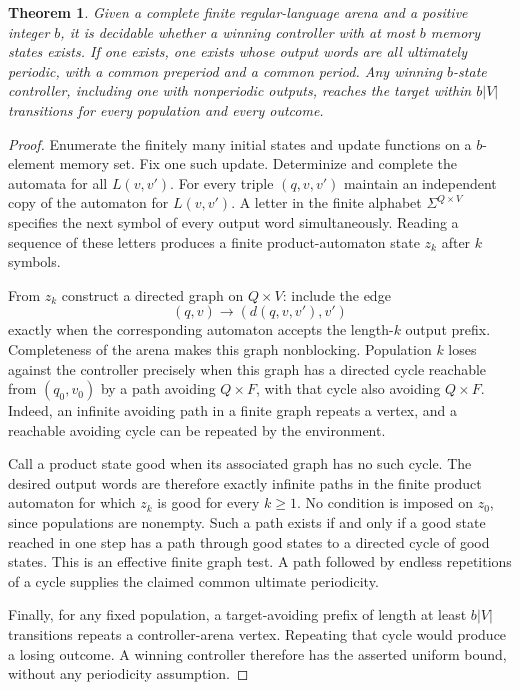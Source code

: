 \documentclass[11pt]{article}
\newtheorem{theorem}{Theorem}
\theoremstyle{definition}
\theoremstyle{remark}
\begin{document}
\begin{theorem}
Given a complete finite regular-language arena and a positive integer $b$, it is decidable whether a winning controller with at most $b$ memory states exists. If one exists, one exists whose output words are all ultimately periodic, with a common preperiod and a common period. Any winning $b$-state controller, including one with nonperiodic outputs, reaches the target within $b|V|$ transitions for every population and every outcome.
\end{theorem}
\begin{proof}
Enumerate the finitely many initial states and update functions on a $b$-element memory set. Fix one such update. Determinize and complete the automata for all $L(v,v')$. For every triple $(q,v,v')$ maintain an independent copy of the automaton for $L(v,v')$. A letter in the finite alphabet $\Sigma^{Q\times V}$ specifies the next symbol of every output word simultaneously. Reading a sequence of these letters produces a finite product-automaton state $z_k$ after $k$ symbols.

From $z_k$ construct a directed graph on $Q\times V$: include the edge
\[
 (q,v)\longrightarrow(d(q,v,v'),v')
\]
exactly when the corresponding automaton accepts the length-$k$ output prefix. Completeness of the arena makes this graph nonblocking. Population $k$ loses against the controller precisely when this graph has a directed cycle reachable from $(q_0,v_0)$ by a path avoiding $Q\times F$, with that cycle also avoiding $Q\times F$. Indeed, an infinite avoiding path in a finite graph repeats a vertex, and a reachable avoiding cycle can be repeated by the environment.

Call a product state good when its associated graph has no such cycle. The desired output words are therefore exactly infinite paths in the finite product automaton for which $z_k$ is good for every $k\geq1$. No condition is imposed on $z_0$, since populations are nonempty. Such a path exists if and only if a good state reached in one step has a path through good states to a directed cycle of good states. This is an effective finite graph test. A path followed by endless repetitions of a cycle supplies the claimed common ultimate periodicity.

Finally, for any fixed population, a target-avoiding prefix of length at least $b|V|$ transitions repeats a controller-arena vertex. Repeating that cycle would produce a losing outcome. A winning controller therefore has the asserted uniform bound, without any periodicity assumption.
\end{proof}
\end{document}
